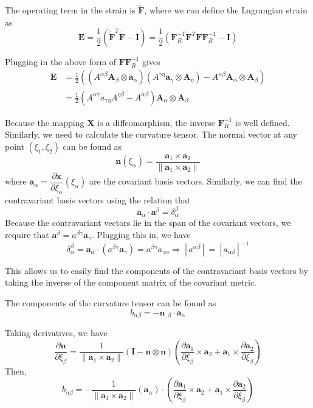 \documentclass[11pt]{article}
\theoremstyle{plain}
\theoremstyle{definition}
\begin{document}
The operating term in the strain is $\tilde{\mathbf{F}}$, where we can define the Lagrangian strain as
\[
\mathbf{E} = \frac{1}{2} \left( \tilde{\mathbf{F}}^T \tilde{\mathbf{F}} - \mathbf{I}\right) = \frac{1}{2} \left(\mathbf{F}_R^{-T} \mathbf{F}^T \mathbf{F} \mathbf{F}_R^{-1} - \mathbf{I} \right)
\]

Plugging in the above form of $\mathbf{F}\mathbf{F}_R^{-1}$ gives
\[
\begin{split}
\mathbf{E} &= \frac{1}{2} \left( \left(A^{\alpha \beta} \mathbf{A}_\beta \otimes \mathbf{a}_\alpha\right)\left( A^{\gamma \eta}\mathbf{a}_{\gamma} \otimes \mathbf{A}_{\eta} \right) - A^{\alpha \beta}\mathbf{A}_\alpha \otimes \mathbf{A}_\beta\right)\\
&= \frac{1}{2} \left( A^{\alpha \gamma} a_{\gamma \eta} A^{\eta \beta}   - A^{\alpha \beta}\right) \mathbf{A}_\alpha \otimes \mathbf{A}_\beta
\end{split}
\]

Because the mapping $\mathbf{X}$ is a diffeomorphism, the inverse $\mathbf{F}_R^{-1}$ is well defined. Similarly, we need to calculate the curvature tensor. The normal vector at any point $(\xi_1,\xi_2)$ can be found as
\[
\mathbf{n}(\xi_\alpha) = \frac{\mathbf{a}_1 \times \mathbf{a}_2}{\| \mathbf{a}_1 \times \mathbf{a}_2 \|}
\]
where $\mathbf{a}_\alpha = \dfrac{\partial \mathbf{x}}{\partial \xi_\alpha}(\xi_\alpha)$ are the covariant basis vectors. Similarly, we can find the contravariant basis vectors using the relation that
\[
\mathbf{a}_\alpha \cdot \mathbf{a}^\beta = \delta_\alpha^\beta
\]
Because the contravariant vectors lie in the span of the covariant vectors, we require that $\mathbf{a}^\beta = a^{\beta \gamma} \mathbf{a}_\gamma$. Plugging this in, we have
\[
\delta_\alpha^\beta = \mathbf{a}_\alpha \cdot (a^{\beta \gamma} \mathbf{a}_\gamma) = a^{\beta \gamma} a_{\gamma \alpha} \Rightarrow [a^{\alpha \beta}] =[a_{\alpha \beta} ]^{-1} 
\]

This allows us to easily find the components of the contravariant basis vectors by taking the inverse of the component matrix of the covariant metric. 

The components of the curvature tensor can be found as
\[
b_{\alpha \beta} = - \mathbf{n}_{,\beta} \cdot \mathbf{a}_\alpha
\]

Taking derivatives, we have
\[
\dfrac{\partial \mathbf{n}}{\partial \xi_\beta} = \frac{1}{\| \mathbf{a}_1 \times \mathbf{a}_2 \|} \left( \mathbf{I} - \mathbf{n} \otimes \mathbf{n} \right) \left( \dfrac{\partial \mathbf{a}_1}{\partial \xi_\beta} \times \mathbf{a}_2 + \mathbf{a}_1 \times \dfrac{\partial \mathbf{a}_2}{\partial \xi_\beta } \right)
\]
Then,
\[
b_{\alpha \beta} = - \frac{1}{\| \mathbf{a}_1 \times \mathbf{a}_2 \|} \left(\mathbf{a}_\alpha \right) \cdot \left( \dfrac{\partial \mathbf{a}_1}{\partial \xi_\beta} \times \mathbf{a}_2 + \mathbf{a}_1 \times \dfrac{\partial \mathbf{a}_2}{\partial \xi_\beta } \right)
\]
\end{document}
